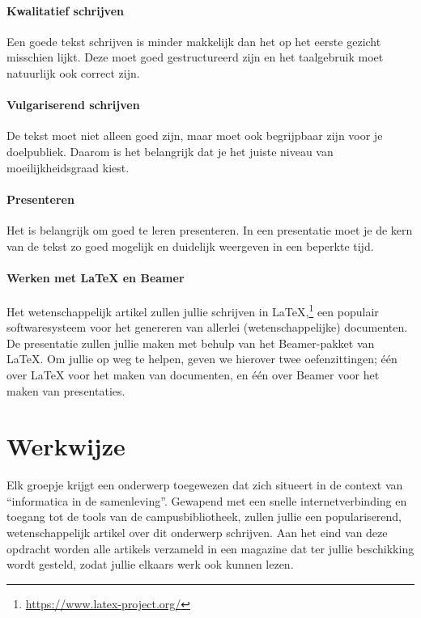 \documentclass[a4paper]{article}
\begin{document}
\paragraph{Kwalitatief schrijven}
Een goede tekst schrijven is minder makkelijk dan het op het eerste gezicht misschien lijkt.
Deze moet goed gestructureerd zijn en het taalgebruik moet natuurlijk ook correct zijn.

\paragraph{Vulgariserend schrijven}
De tekst moet niet alleen goed zijn, maar moet ook begrijpbaar zijn voor je doelpubliek.
Daarom is het belangrijk dat je het juiste niveau van moeilijkheidsgraad kiest.

\paragraph{Presenteren}
Het is belangrijk om goed te leren presenteren.
In een presentatie moet je de kern van de tekst zo goed mogelijk en duidelijk weergeven in een beperkte tijd.

\paragraph{Werken met \LaTeX{} en \textbf{Beamer}}
Het wetenschappelijk artikel zullen jullie schrijven in \LaTeX{},\footnote{\url{https://www.latex-project.org/}} een populair softwaresysteem voor het genereren van allerlei (wetenschappelijke) documenten.
De presentatie zullen jullie maken met behulp van het Beamer-pakket van \LaTeX{}.
Om jullie op weg te helpen, geven we hierover twee oefenzittingen; \'e\'en over \LaTeX{} voor het maken van documenten, en \'e\'en over Beamer voor het maken van presentaties.


\section{Werkwijze}

Elk groepje krijgt een onderwerp toegewezen dat zich situeert in de context van ``informatica in de samenleving''.
Gewapend met een snelle internetverbinding en toegang tot de tools van de campusbibliotheek, zullen jullie een populariserend, wetenschappelijk artikel over dit onderwerp schrijven.
Aan het eind van deze opdracht worden alle artikels verzameld in een magazine dat ter jullie beschikking wordt gesteld, zodat jullie elkaars werk ook kunnen lezen.
\end{document}
